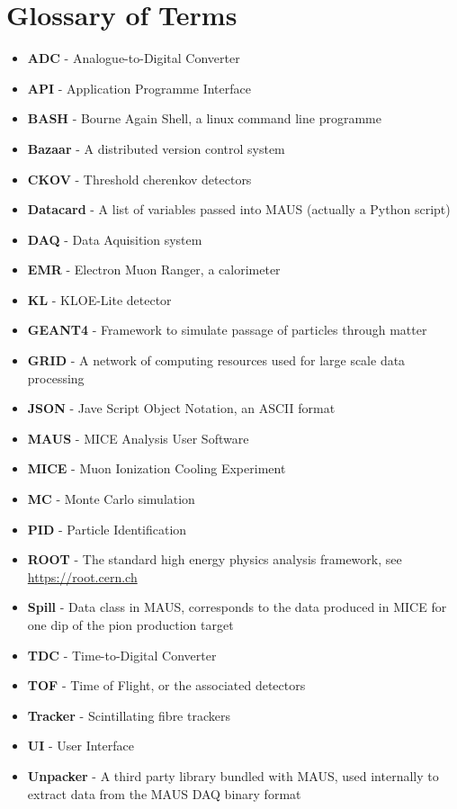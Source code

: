 \documentclass[a4paper,10pt]{article}
\begin{document}
\section{Glossary of Terms}
\begin{itemize}
  \item \textbf{ADC} - Analogue-to-Digital Converter
  \item \textbf{API} - Application Programme Interface
  \item \textbf{BASH} - Bourne Again Shell, a linux command line programme
  \item \textbf{Bazaar} - A distributed version control system
  \item \textbf{CKOV} - Threshold cherenkov detectors
  \item \textbf{Datacard} - A list of variables passed into MAUS (actually a Python script)
  \item \textbf{DAQ} - Data Aquisition system
  \item \textbf{EMR} - Electron Muon Ranger, a calorimeter
  \item \textbf{KL} - KLOE-Lite detector
  \item \textbf{GEANT4} - Framework to simulate passage of particles through matter
  \item \textbf{GRID} - A network of computing resources used for large scale data processing
  \item \textbf{JSON} - Jave Script Object Notation, an ASCII format
  \item \textbf{MAUS} - MICE Analysis User Software
  \item \textbf{MICE} - Muon Ionization Cooling Experiment
  \item \textbf{MC} - Monte Carlo simulation
  \item \textbf{PID} - Particle Identification
  \item \textbf{ROOT} - The standard high energy physics analysis framework, see \url{https://root.cern.ch}
  \item \textbf{Spill} - Data class in MAUS, corresponds to the data produced in MICE for one dip of the pion production target
  \item \textbf{TDC} - Time-to-Digital Converter
  \item \textbf{TOF} - Time of Flight, or the associated detectors
  \item \textbf{Tracker} - Scintillating fibre trackers
  \item \textbf{UI} - User Interface
  \item \textbf{Unpacker} - A third party library bundled with MAUS, used internally to extract data from the MAUS DAQ binary format
\end{itemize}
\end{document}
